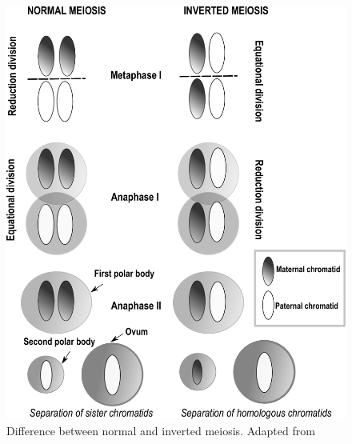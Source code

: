 \begin{figure}[H]
	\centering
	\includegraphics[scale = 0.6]{Images/meiosis.pdf}
	\caption{Difference between normal and inverted meiosis. Adapted from \citet{Brown1964, Wrensch1994, Bongiorni2004}}
	\label{fig:meiosis}
\end{figure} 

